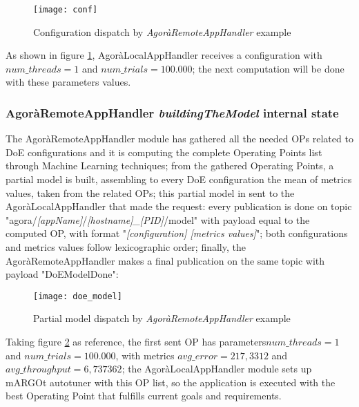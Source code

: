 \begin{figure}[H]

    \centering
    \texttt{[image: conf]}
    \caption{Configuration dispatch by \textit{AgoràRemoteAppHandler} example}
    \label{fig:conf}
    
\end{figure}

As shown in figure \ref{fig:conf}, AgoràLocalAppHandler receives a configuration with $num\_threads = 1$ and $num\_trials = 100.000$; the next computation will be done with these parameters values.


\subsubsection{AgoràRemoteAppHandler \textit{buildingTheModel} internal state}\label{DoEModelSend}

The AgoràRemoteAppHandler module has gathered all the needed OPs related to DoE configurations and it is computing the complete Operating Points list through Machine Learning techniques; from the gathered Operating Points, a partial model is built, assembling to every DoE configuration the mean of metrics values, taken from the related OPs; this partial model in sent to the AgoràLocalAppHandler that made the request: every publication is done on topic "agora/\textit{[appName]}/\textit{[hostname]\_[PID]}/model" with payload equal to the computed OP, with format "\textit{[configuration] [metrics values]}"; both configurations and metrics values follow lexicographic order; finally, the AgoràRemoteAppHandler makes a final publication on the same topic with payload "DoEModelDone":

\begin{figure}[H]

    \centering
    \texttt{[image: doe\_model]}
    \caption{Partial model dispatch by \textit{AgoràRemoteAppHandler} example}
    \label{fig:doe_model}
    
\end{figure}

Taking figure \ref{fig:doe_model} as reference, the first sent OP has parameters\linebreak $num\_threads = 1$ and $num\_trials = 100.000$, with metrics $avg\_error = 217,3312$ and $avg\_throughput = 6,737362$; the AgoràLocalAppHandler module sets up mARGOt autotuner with this OP list, so the application is executed with the best Operating Point that fulfills current goals and requirements.

